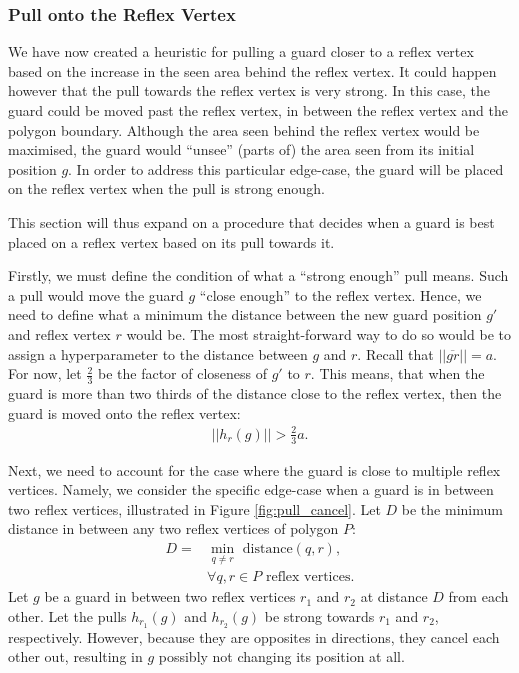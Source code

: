 \subsubsection{Pull onto the Reflex Vertex}
\label{sec:pull_onto}
We have now created a heuristic for pulling a guard closer to a reflex vertex based on the increase in the seen area behind the reflex vertex. It could happen however that the pull towards the reflex vertex is very strong. In this case, the guard could be moved past the reflex vertex, in between the reflex vertex and the polygon boundary. Although the area seen behind the reflex vertex would be maximised, the guard would ``unsee'' (parts of) the area seen from its initial position $g$. In order to address this particular edge-case, the guard will be placed on the reflex vertex when the pull is strong enough. 

This section will thus expand on a procedure that decides when a guard is best placed on a reflex vertex based on its pull towards it.

Firstly, we must define the condition of what a ``strong enough'' pull means. Such a pull would move the guard $g$ ``close enough'' to the reflex vertex. Hence, we need to define what a minimum the distance between the new guard position $g'$ and reflex vertex $r$ would be. The most straight-forward way to do so would be to assign a hyperparameter to the distance between $g$ and $r$. Recall that $||\overline{gr}|| = a$. For now, let $\frac 2 3$ be the factor of closeness of $g'$ to $r$. This means, that when the guard is more than two thirds of the distance close to the reflex vertex, then the guard is moved onto the reflex vertex: 
\begin{align}
    ||h_r(g)|| > \frac 2 3 a. \label{eq:h_a}
\end{align}

Next, we need to account for the case where the guard is close to multiple reflex vertices. Namely, we consider the specific edge-case when a guard is in between two reflex vertices, illustrated in Figure \ref{fig:pull_cancel}. Let $D$ be the minimum distance in between any two reflex vertices of polygon $P$:
\begin{align*}
    D = &\min_{q \neq r} \text{ distance}(q, r), \\
    &\forall q, r \in P \text{ reflex vertices}.
\end{align*}
Let $g$ be a guard in between two reflex vertices $r_1$ and $r_2$ at distance $D$ from each other. Let the pulls $h_{r_1}(g)$ and $h_{r_2}(g)$ be strong towards $r_1$ and $r_2$, respectively. However, because they are opposites in directions, they cancel each other out, resulting in $g$ possibly not changing its position at all.

